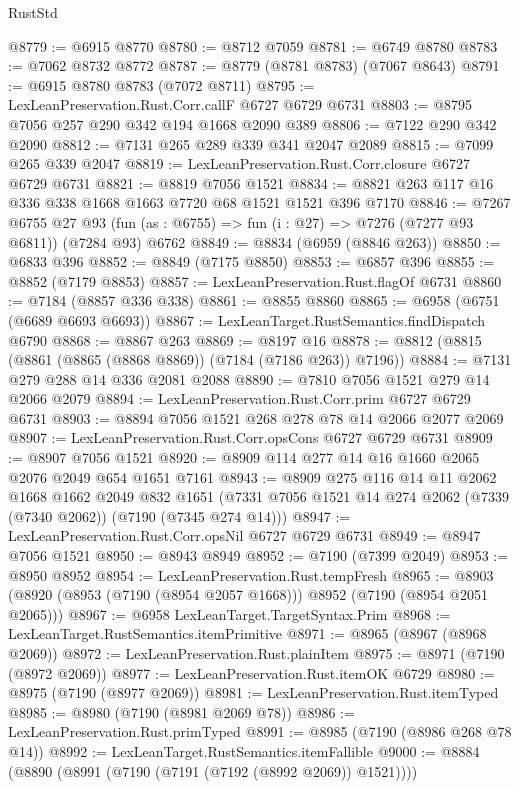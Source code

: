 \begin{lexlean}{RustStd}
\begin{coremodule}
@8779 := @6915 @8770
@8780 := @8712 @7059
@8781 := @6749 @8780
@8783 := @7062 @8732 @8772
@8787 := @8779 (@8781 @8783) (@7067 @8643)
@8791 := @6915 @8780 @8783 (@7072 @8711)
@8795 := LexLeanPreservation.Rust.Corr.callF @6727 @6729 @6731
@8803 := @8795 @7056 @257 @290 @342 @194 @1668 @2090 @389
@8806 := @7122 @290 @342 @2090
@8812 := @7131 @265 @289 @339 @341 @2047 @2089
@8815 := @7099 @265 @339 @2047
@8819 := LexLeanPreservation.Rust.Corr.closure @6727 @6729 @6731
@8821 := @8819 @7056 @1521
@8834 := @8821 @263 @117 @16 @336 @338 @1668 @1663 @7720 @68 @1521 @1521 @396 @7170
@8846 := @7267
    @6755
    @27
    @93
    (fun (as : @6755) => fun (i : @27) => @7276 (@7277 @93 @6811))
    (@7284 @93)
    @6762
@8849 := @8834 (@6959 (@8846 @263))
@8850 := @6833 @396
@8852 := @8849 (@7175 @8850)
@8853 := @6857 @396
@8855 := @8852 (@7179 @8853)
@8857 := LexLeanPreservation.Rust.flagOf @6731
@8860 := @7184 (@8857 @336 @338)
@8861 := @8855 @8860
@8865 := @6958 (@6751 (@6689 @6693 @6693))
@8867 := LexLeanTarget.RustSemantics.findDispatch @6790
@8868 := @8867 @263
@8869 := @8197 @16
@8878 := @8812 (@8815 (@8861 (@8865 (@8868 @8869)) (@7184 (@7186 @263)) @7196))
@8884 := @7131 @279 @288 @14 @336 @2081 @2088
@8890 := @7810 @7056 @1521 @279 @14 @2066 @2079
@8894 := LexLeanPreservation.Rust.Corr.prim @6727 @6729 @6731
@8903 := @8894 @7056 @1521 @268 @278 @78 @14 @2066 @2077 @2069
@8907 := LexLeanPreservation.Rust.Corr.opsCons @6727 @6729 @6731
@8909 := @8907 @7056 @1521
@8920 := @8909 @114 @277 @14 @16 @1660 @2065 @2076 @2049 @654 @1651 @7161
@8943 := @8909
    @275
    @116
    @14
    @11
    @2062
    @1668
    @1662
    @2049
    @832
    @1651
    (@7331 @7056 @1521 @14 @274 @2062 (@7339 (@7340 @2062)) (@7190 (@7345 @274 @14)))
@8947 := LexLeanPreservation.Rust.Corr.opsNil @6727 @6729 @6731
@8949 := @8947 @7056 @1521
@8950 := @8943 @8949
@8952 := @7190 (@7399 @2049)
@8953 := @8950 @8952
@8954 := LexLeanPreservation.Rust.tempFresh
@8965 := @8903 (@8920 (@8953 (@7190 (@8954 @2057 @1668))) @8952 (@7190 (@8954 @2051 @2065)))
@8967 := @6958 LexLeanTarget.TargetSyntax.Prim
@8968 := LexLeanTarget.RustSemantics.itemPrimitive
@8971 := @8965 (@8967 (@8968 @2069))
@8972 := LexLeanPreservation.Rust.plainItem
@8975 := @8971 (@7190 (@8972 @2069))
@8977 := LexLeanPreservation.Rust.itemOK @6729
@8980 := @8975 (@7190 (@8977 @2069))
@8981 := LexLeanPreservation.Rust.itemTyped
@8985 := @8980 (@7190 (@8981 @2069 @78))
@8986 := LexLeanPreservation.Rust.primTyped
@8991 := @8985 (@7190 (@8986 @268 @78 @14))
@8992 := LexLeanTarget.RustSemantics.itemFallible
@9000 := @8884 (@8890 (@8991 (@7190 (@7191 (@7192 (@8992 @2069)) @1521))))

\end{coremodule}
\end{lexlean}
